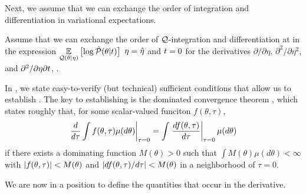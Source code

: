 Next, we assume that we can exchange the order of integration and
differentiation in variational expectations.

%
\begin{assu}
%
Assume that we can exchange the order of $\mathcal{Q}$-integration and differentiation at
in the expression $\underset{\mathcal{Q}(\theta \vert \eta)}{\mathbb{E}}\left[\log \tilde{\mathcal{P}}(\theta \vert t)\right]$
$\eta = \hat\eta$ and $t = 0$ for the derivatives $\partial / \partial \eta$,
$\partial^2 / \partial \eta^2$, and $\partial^2 / \partial \eta \partial t$, .
%
\end{assu}

In , we state easy-to-verify (but technical) sufficient
conditions that allow us to establish .  The key to
establishing  is the dominated convergence theorem
\citep[Theorem 16.8]{billingsley:1986:probability}, which states roughly that,
for some scalar-valued funciton $f(\theta, \tau)$,
%
\begin{align*}
%
\left. \frac{d}{d\tau} \int f(\theta, \tau) \mu(d\theta) \right|_{\tau=0} =
     \int \fracat{df(\theta, \tau)}{d\tau}{\tau=0}  \mu(d\theta)
%
\end{align*}
%
if there exists a dominating function $M(\theta) > 0$ such that
$\int M(\theta) \mu(d\theta) < \infty$ with $\left|f(\theta, \tau)\right| < M(\theta)$
and $\left|df(\theta, \tau) / d\tau\right| < M(\theta)$ in a neighborhood of $\tau=0$.

We are now in a position to define the quantities that occur in the derivative.


